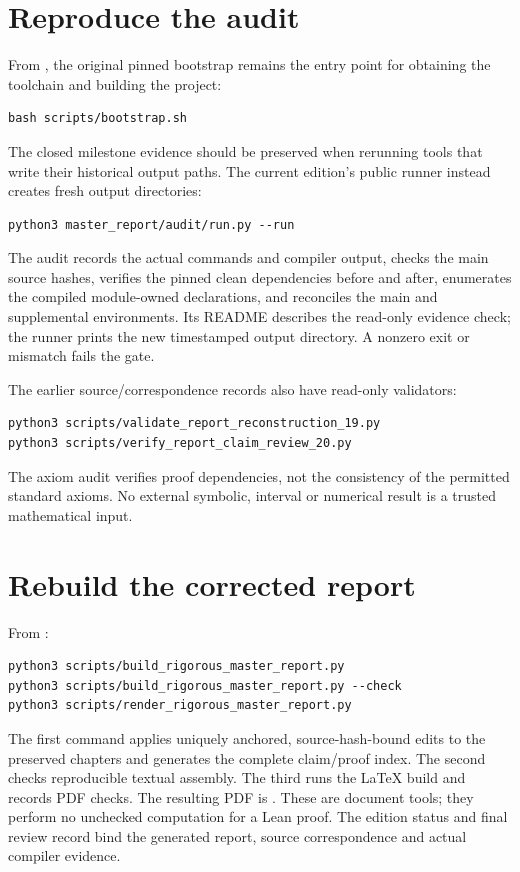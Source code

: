

\section{Reproduce the audit}\label{reproduce-the-audit}

From , the original pinned bootstrap remains the entry point for obtaining the toolchain and building the project:
\begin{verbatim}
bash scripts/bootstrap.sh
\end{verbatim}
The closed milestone evidence should be preserved when rerunning tools that write their historical output paths. The current edition's public runner instead creates fresh output directories:
\begin{verbatim}
python3 master_report/audit/run.py --run
\end{verbatim}
The audit records the actual commands and compiler output, checks the main source hashes, verifies the pinned clean dependencies before and after, enumerates the compiled module-owned declarations, and reconciles the main and supplemental environments. Its README describes the read-only evidence check; the runner prints the new timestamped output directory. A nonzero exit or mismatch fails the gate.

The earlier source/correspondence records also have read-only validators:
\begin{verbatim}
python3 scripts/validate_report_reconstruction_19.py
python3 scripts/verify_report_claim_review_20.py
\end{verbatim}
The axiom audit verifies proof dependencies, not the consistency of the permitted standard axioms. No external symbolic, interval or numerical result is a trusted mathematical input.



\section{Rebuild the corrected report}\label{rebuild-the-report}

From :
\begin{verbatim}
python3 scripts/build_rigorous_master_report.py
python3 scripts/build_rigorous_master_report.py --check
python3 scripts/render_rigorous_master_report.py
\end{verbatim}
The first command applies uniquely anchored, source-hash-bound edits to the preserved chapters and generates the complete claim/proof index. The second checks reproducible textual assembly. The third runs the LaTeX build and records PDF checks. The resulting PDF is . These are document tools; they perform no unchecked computation for a Lean proof. The edition status and final review record bind the generated report, source correspondence and actual compiler evidence.


